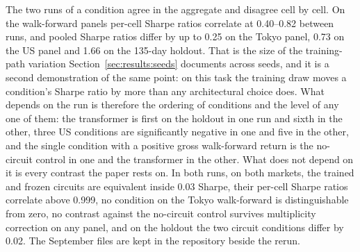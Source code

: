 The two runs of a condition agree in the aggregate and disagree cell by cell.
On the walk-forward panels per-cell Sharpe ratios correlate at
\numrange{0.40}{0.82} between runs, and pooled Sharpe ratios differ by up to
\num{0.25} on the Tokyo panel, \num{0.73} on the US panel and \num{1.66} on the
\num{135}-day holdout. That is the size of the training-path variation
Section~\ref{sec:results:seeds} documents across seeds, and it is a second
demonstration of the same point: on this task the training draw moves a
condition's Sharpe ratio by more than any architectural choice does. What
depends on the run is therefore the ordering of conditions and the level of any
one of them: the transformer is first on the holdout in one run and sixth in
the other, three US conditions are significantly negative in one and five in
the other, and the single condition with a positive gross walk-forward return
is the no-circuit control in one and the transformer in the other. What does
not depend on it is every contrast the paper rests on. In both runs, on both
markets, the trained and frozen circuits are equivalent inside \num{0.03}
Sharpe, their per-cell Sharpe ratios correlate above \num{0.999}, no condition
on the Tokyo walk-forward is distinguishable from zero, no contrast against the
no-circuit control survives multiplicity correction on any panel, and on the
holdout the two circuit conditions differ by \num{0.02}. The September files are
kept in the repository beside the rerun.
